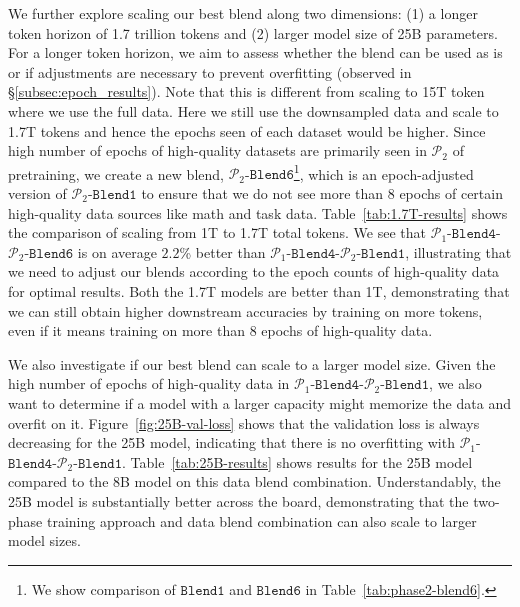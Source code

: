 \documentclass[11pt]{article}
\newcommand{\todo}[1]{{\color{red}\bf [TODO: #1]}\xspace}
\newcommand{\phaseone}{$\mathcal{P}_1$\xspace}
\newcommand{\phasetwo}{$\mathcal{P}_2$\xspace}
\newcommand{\ponebfourptwobone}{\phaseone-$\mathtt{Blend4}$-\phasetwo-$\mathtt{Blend1}$\xspace}
\newcommand{\ptwobone}{\phasetwo-$\mathtt{Blend1}$\xspace}
\newcommand{\ptwobsix}{\phasetwo-$\mathtt{Blend6}$\xspace}
\newcommand{\ponebfourptwobsix}{\phaseone-$\mathtt{Blend4}$-\phasetwo-$\mathtt{Blend6}$\xspace}
\begin{document}
We further explore scaling our best blend along two dimensions: (1) a longer token horizon of 1.7 trillion tokens and (2) larger model size of 25B parameters.
For a longer token horizon, we aim to assess whether the blend can be used as is or if adjustments are necessary to prevent overfitting (observed in \S\ref{subsec:epoch_results}).
Note that this is different from scaling to 15T token where we use the full data.
Here we still use the downsampled data and scale to 1.7T tokens and hence the epochs seen of each dataset would be higher.
Since high number of epochs of high-quality datasets are primarily seen in \phasetwo of pretraining, we create a new blend, \ptwobsix\footnote{We show comparison of $\mathtt{Blend1}$ and $\mathtt{Blend6}$ in Table~\ref{tab:phase2-blend6}.}, which is an epoch-adjusted version of \ptwobone to ensure that we do not see more than 8 epochs of certain high-quality data sources like math and task data. %
Table~\ref{tab:1.7T-results} shows the comparison of scaling 
from 1T to 1.7T total tokens.
We see that \ponebfourptwobsix is on average $2.2$\% better than \ponebfourptwobone, illustrating that we need to adjust our blends according to the epoch counts of high-quality data for optimal results.
Both the 1.7T models are better than 1T, demonstrating that we can still obtain higher downstream accuracies by training on more tokens, even if it means training on more than 8 epochs of high-quality data.

We also investigate if our best blend can scale to a larger model size.
Given the high number of epochs of high-quality data in \ponebfourptwobone, we also want to determine if a model with a larger capacity might memorize the data and overfit on it.
Figure~\ref{fig:25B-val-loss} shows that the validation loss is always decreasing for the 25B model, indicating that there is no overfitting with \ponebfourptwobone.
Table~\ref{tab:25B-results} shows results for the 25B model compared to the 8B model on this data blend combination. 
Understandably, the 25B model is substantially better across the board, demonstrating that the two-phase training approach and data blend combination can also scale to larger model sizes.
\end{document}
